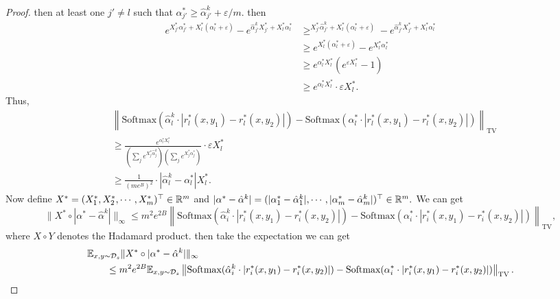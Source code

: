 \begin{proof}
    then at least one $j'\neq l$ such that $\alpha_{j'}^* \ge \hat{\alpha}_{j'}^k + \varepsilon/m$.
    then 
    \begin{align*}
        e^{X_{j'}^* \alpha_{j'}^*+ X_l^*(\alpha_l^*+\varepsilon)}-e^{\hat{\alpha}_{j'}^k X_{j'}^* + X_l^*\alpha_l^*}&\ge ^{X_{j'}^* \hat{\alpha}_{j'}^k+ X_l^*(\alpha_l^*+\varepsilon)}-e^{\hat{\alpha}_{j'}^k X_{j'}^* + X_l^*\alpha_l^*}
        \\&\ge e^{X_l^*(\alpha_l^* + \varepsilon)} - e^{X_l^* \alpha_l^*}\\
        &\ge e^{\alpha_l^* X_l^*}(e^{\varepsilon X_l^*}-1)\\
        &\ge e^{\alpha_l^* X_l^*}\cdot \varepsilon X_l^*.
    \end{align*}
    Thus,
    \begin{align*}
        &\left\|\textrm{Softmax}(\hat{\alpha}_l^k \cdot |r_l^*(x,y_1)-r_l^*(x,y_2)|)-\textrm{Softmax}(\alpha_l^*\cdot |r_l^*(x,y_1)-r_l^*(x,y_2)|)\right\|_{\mathrm{TV}}\\
        &\ge \frac{e^{\alpha_l^* X_l^*}}{(\sum_j e^{X_j^*\hat{\alpha}_j^k})(\sum_j e^{X_j^*\alpha_j^*})} \cdot \varepsilon X_l^*\\
        &\ge \frac{1}{(me^B)^2}  \cdot |\hat{\alpha}_l^k - \alpha_l^*| X_l^*.
    \end{align*}
    Now define $X^* =  (X_1^*, X_2^*, \cdots, X_m^*)^\top \in \mathbb{R}^m$ and $|\alpha^* - \hat{\alpha}^k| = (|\alpha_1^*-\hat{\alpha}_1^k|, \cdots, |\alpha_m^*-\hat{\alpha}_m^k|)^\top \in \mathbb{R}^m.$ We can get 
    $$\|X^*\circ |\alpha^* - \hat{\alpha}^k|\|_\infty\le m^2e^{2B} \left\|\textrm{Softmax}(\hat{\alpha}_i^k \cdot |r_i^*(x,y_1)-r_i^*(x,y_2)|)-\textrm{Softmax}(\alpha_i^*\cdot |r_i^*(x,y_1)-r_i^*(x,y_2)|)\right\|_{\mathrm{TV}},$$
    where $X\circ Y$ denotes the Hadamard product.
    then take the expectation we can get 
    \begin{align*}
        &\mathbb{E}_{x,y\sim \mathcal{D}_s}\|X^*\circ |\alpha^* - \hat{\alpha}^k|\|_\infty\\&\qquad \le m^2e^{2B} \mathbb{E}_{x,y\sim \mathcal{D}_s}\left\|\textrm{Softmax}(\hat{\alpha}_i^k \cdot |r_i^*(x,y_1)-r_i^*(x,y_2)|)-\textrm{Softmax}(\alpha_i^*\cdot |r_i^*(x,y_1)-r_i^*(x,y_2)|)\right\|_{\mathrm{TV}}.
    \end{align*}



\end{proof}
